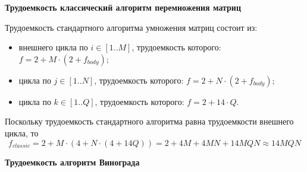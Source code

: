 \textbf{Трудоемкость классический алгоритм перемножения матриц}

Трудоемкость стандартного алгоритма умножения матриц состоит из:

\begin{itemize}
	\item внешнего цикла по $i \in [1..M]$, трудоемкость которого: $f = 2 + M \cdot (2 + f_{body})$;
	\item цикла по $j \in [1..N]$, трудоемкость которого: $f = 2 + N \cdot (2 + f_{body})$;
	\item цикла по $k \in [1..Q]$, трудоемкость которого: $f = 2 + 14 \cdot Q$.
\end{itemize}

Поскольку трудоемкость стандартного алгоритма равна трудоемкости внешнего цикла, то
\begin{equation}
	\label{for:classic}
	f_{classic} = 2 + M \cdot (4 + N \cdot (4 + 14Q)) = 2 + 4M + 4MN + 14MQN \approx 14MQN
\end{equation}

\textbf{Трудоемкость алгоритм Винограда}

